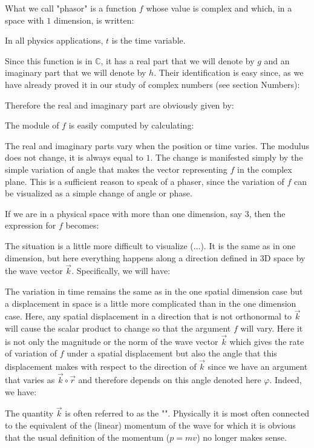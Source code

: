 	What we call "phasor" is a function $f$ whose value is complex and which, in a space with $1$ dimension, is written:
	
	In all physics applications, $t$ is the time variable.
	
	Since this function is in $\mathbb{C}$, it has a real part that we will denote by $g$ and an imaginary part that we will denote by $h$. Their identification is easy since, as we have already proved it in our study of complex numbers (see section Numbers):
	
	Therefore the real and imaginary part are obviously given by:
	
	The module of $f$ is easily computed by calculating:
	
	The real and imaginary parts vary when the position or time varies. The modulus does not change, it is always equal to $1$. The change is manifested simply by the simple variation of angle that makes the vector representing $f$ in the complex plane. This is a sufficient reason to speak of a phaser, since the variation of $f$ can be visualized as a simple change of angle or phase.

	If we are in a physical space with more than one dimension, say $3$, then the expression for $f$ becomes:
	
	The situation is a little more difficult to visualize (...). It is the same as in one dimension, but here everything happens along a direction defined in 3D space by the wave vector $\vec{k}$. Specifically, we will have:
	
	The variation in time remains the same as in the one spatial dimension case but a displacement in space is a little more complicated than in the one dimension case. Here, any spatial displacement in a direction that is not orthonormal to $\vec{k}$ will cause the scalar product to change so that the argument $f$ will vary. Here it is not only the magnitude or the norm of the wave vector $\vec{k}$ which gives the rate of variation of $f$ under a spatial displacement but also the angle that this displacement makes with respect to the direction of $\vec{k}$  since we have an argument that varies as $\vec{k}\circ\vec{r}$ and therefore depends on this angle denoted here $\varphi$. Indeed, we have:
	
	The quantity $\vec{k}$ is often referred to as the "". Physically it is most often connected to the equivalent of the (linear) momentum of the wave for which it is obvious that the usual definition of the momentum ($p=mv$) no longer makes sense.
	
